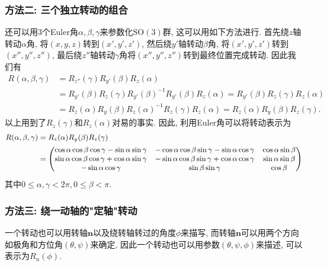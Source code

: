 \documentclass[UTF8]{ctexart}
\begin{document}
\subsubsection{方法二: 三个独立转动的组合}
还可以用3个Euler角$\alpha,\beta,\gamma$来参数化$\mathrm{SO}(3)$群, 这可以用如下方法进行. 首先绕$z$轴转动$\alpha$角, 将$(x,y,z)$转到$(x',y',z')$, 然后绕$y'$轴转动$\beta$角, 将$(x',y',z')$转到$(x'',y'',z'')$, 最后绕$z''$轴转动$\gamma$角将$(x'',y'',z'')$转到最终位置完成转动. 因此我们有
\begin{equation}
  \begin{split}
    R(\alpha, \beta, \gamma) &= R_{z''}(\gamma)R_{y'}(\beta)R_{z}(\alpha) \\
    &= R_{y'}(\beta)R_{z}(\gamma)R_{y'}(\beta)^{-1}R_{y'}(\beta)R_{z}(\alpha) = R_{y'}(\beta)R_{z}(\gamma)R_{z}(\alpha) \\
    &= R_{z}(\alpha)R_{y}(\beta)R_{z}(\alpha)^{-1}R_{z}(\gamma)R_{z}(\alpha) = R_{z}(\alpha)R_{y}(\beta)R_{z}(\gamma).
  \end{split}
\end{equation}
以上用到了$R_z(\gamma)$和$R_z(\alpha)$对易的事实. 因此, 利用Euler角可以将转动表示为
\begin{equation}\small
  \begin{split}
    R(\alpha, \beta, \gamma) &= R_z(\alpha)R_y(\beta)R_z(\gamma) \\
    &=
    \begin{pmatrix}
      \cos\alpha\cos\beta\cos\gamma - \sin\alpha\sin\gamma & -\cos\alpha\cos\beta\sin\gamma - \sin\alpha\cos\gamma & \cos\alpha\sin\beta \\
      \sin\alpha\cos\beta\cos\gamma + \cos\alpha\sin\gamma & -\sin\alpha\cos\beta\sin\gamma + \cos\alpha\cos\gamma & \sin\alpha\sin\beta \\
      -\sin\alpha\cos\gamma & \sin\beta\sin\gamma & \cos\beta
    \end{pmatrix}
  \end{split}
\end{equation}
其中$0 \leq \alpha, \gamma < 2 \pi, 0 \leq \beta < \pi$.

\subsubsection{方法三: 绕一动轴的"定轴"转动}
一个转动也可以用转轴$\bm{n}$以及绕转轴转过的角度$\phi$来描写, 而转轴$\bm{n}$可以用两个方向如极角和方位角$(\theta, \psi)$来确定, 因此一个转动也可以用参数$(\theta, \psi, \phi)$来描述, 可以表示为$R_n(\phi)$.
\end{document}
